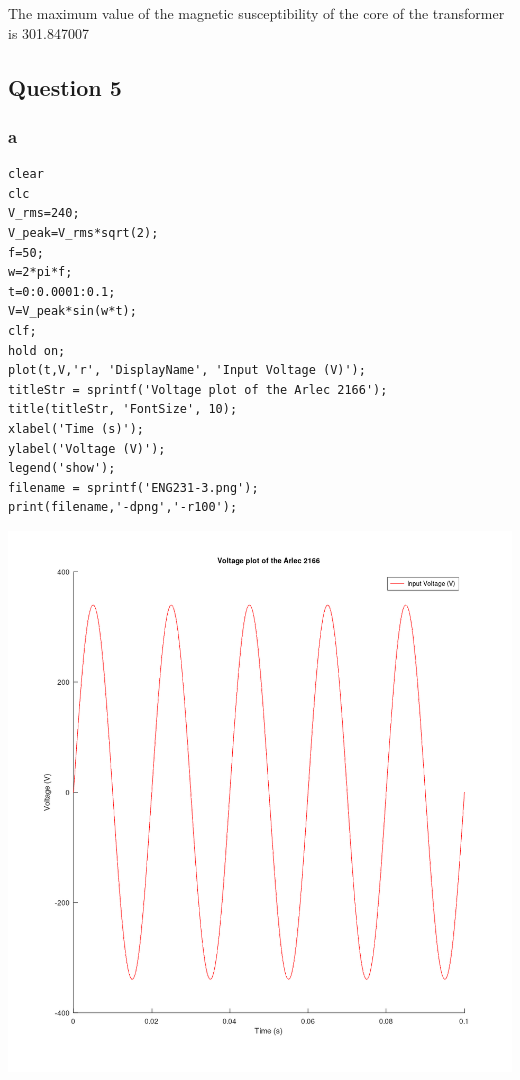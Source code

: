 \documentclass[11pt]{article}
\begin{document}
The maximum value of the magnetic susceptibility of the core of the transformer is 301.847007
\subsection{Question 5}
\label{sec:org350a159}
\subsubsection{a}
\label{sec:org343b0f0}
\begin{verbatim}
clear
clc
V_rms=240;
V_peak=V_rms*sqrt(2);
f=50;
w=2*pi*f;
t=0:0.0001:0.1;
V=V_peak*sin(w*t);
clf;
hold on;
plot(t,V,'r', 'DisplayName', 'Input Voltage (V)');
titleStr = sprintf('Voltage plot of the Arlec 2166');
title(titleStr, 'FontSize', 10);
xlabel('Time (s)');
ylabel('Voltage (V)');
legend('show');
filename = sprintf('ENG231-3.png');
print(filename,'-dpng','-r100');
\end{verbatim}


\begin{center}
\includegraphics[width=.9\linewidth]{ENG231-3.png}
\end{center}
\end{document}

